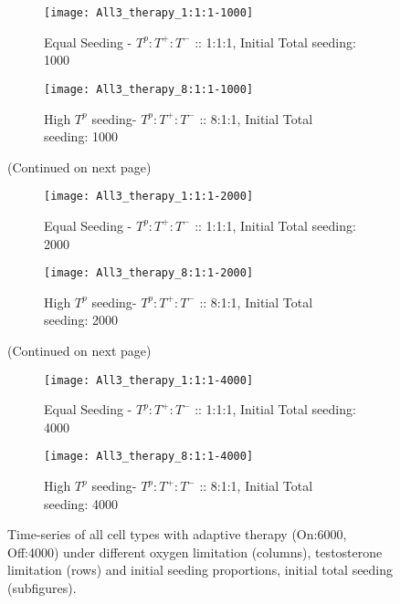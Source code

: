 \begin{figure}[h!]
  \centering
  \begin{subfigure}[b]{\textwidth}
    \centering
    \texttt{[image: All3\_therapy\_1:1:1-1000]}
    \caption{Equal Seeding - $T^p:T^+:T^-$ :: 1:1:1, Initial Total seeding: 1000}
    \label{fig_therapy-AT_1:1:1-1000}
  \end{subfigure}
  \begin{subfigure}[b]{\textwidth}
    \centering
    \texttt{[image: All3\_therapy\_8:1:1-1000]}
    \caption{High $T^p$ seeding- $T^p:T^+:T^-$ :: 8:1:1, Initial Total seeding: 1000}
    \label{fig_therapy-AT_8:1:1-1000}
  \end{subfigure}
  \caption[]{(Continued on next page)}
\end{figure}
\begin{figure}[h!]\ContinuedFloat
  \centering
  \begin{subfigure}[b]{\textwidth}
    \centering
    \texttt{[image: All3\_therapy\_1:1:1-2000]}
    \caption{Equal Seeding - $T^p:T^+:T^-$ :: 1:1:1, Initial Total seeding: 2000}
    \label{fig_therapy-AT_1:1:1-2000}
  \end{subfigure}
  \begin{subfigure}[b]{\textwidth}
    \centering
    \texttt{[image: All3\_therapy\_8:1:1-2000]}
    \caption{High $T^p$ seeding- $T^p:T^+:T^-$ :: 8:1:1, Initial Total seeding: 2000}
    \label{fig_therapy-AT_8:1:1-2000}
  \end{subfigure}
  \caption[]{(Continued on next page)}
\end{figure}
\begin{figure}[h!]\ContinuedFloat
  \centering
  \begin{subfigure}[b]{\textwidth}
    \centering
    \texttt{[image: All3\_therapy\_1:1:1-4000]}
    \caption{Equal Seeding - $T^p:T^+:T^-$ :: 1:1:1, Initial Total seeding: 4000}
    \label{fig_therapy-AT_1:1:1-4000}
  \end{subfigure}
  \begin{subfigure}[b]{\textwidth}
    \centering
    \texttt{[image: All3\_therapy\_8:1:1-4000]}
    \caption{High $T^p$ seeding- $T^p:T^+:T^-$ :: 8:1:1, Initial Total seeding: 4000}
    \label{fig_therapy-AT_8:1:1-4000}
  \end{subfigure}
  \caption[Time-series of all cell types with adaptive therapy]{Time-series of all cell types with adaptive therapy (On:6000, Off:4000) under different oxygen limitation (columns), testosterone limitation (rows) and initial seeding proportions, initial total seeding (subfigures).}
  \label{fig_therapy-AT}
\end{figure}

